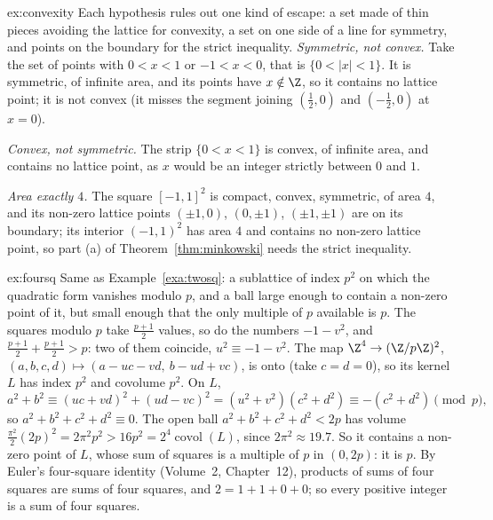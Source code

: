 \begin{solution}{ex:convexity}
\idea Each hypothesis rules out one kind of escape: a set made of thin pieces avoiding the lattice for convexity, a set
on one side of a line for symmetry, and points on the boundary for the strict inequality.
\writeup \emph{Symmetric, not convex.} Take the set of points with $0<x<1$ or $-1<x<0$, that is $\{0<|x|<1\}$. It is symmetric, of infinite area, and its
points have $x\notin\Z$, so it contains no lattice point; it is not convex (it misses the segment joining $(\frac12,0)$
and $(-\frac12,0)$ at $x=0$).

\emph{Convex, not symmetric.} The strip $\{0<x<1\}$ is convex, of infinite area, and contains no lattice point, as $x$
would be an integer strictly between $0$ and $1$.

\emph{Area exactly $4$.} The square $[-1,1]^2$ is compact, convex, symmetric, of area $4$, and its non-zero lattice points
$(\pm1,0)$, $(0,\pm1)$, $(\pm1,\pm1)$ are on its boundary; its interior $(-1,1)^2$ has area $4$ and contains no non-zero
lattice point, so part (a) of Theorem~\ref{thm:minkowski} needs the strict inequality.
\end{solution}

\begin{solution}{ex:foursq}
\idea Same as Example~\ref{exa:twosq}: a sublattice of index $p^2$ on which the quadratic form vanishes modulo $p$, and a
ball large enough to contain a non-zero point of it, but small enough that the only multiple of $p$ available is $p$.
\writeup The squares modulo $p$ take $\frac{p+1}2$ values, so do the numbers $-1-v^2$, and $\frac{p+1}2+\frac{p+1}2>p$: two of
them coincide, $u^2\equiv-1-v^2$. The map $\Z^4\to(\Z/p\Z)^2$, $(a,b,c,d)\mapsto(a-uc-vd,\ b-ud+vc)$, is onto (take
$c=d=0$), so its kernel $L$ has index $p^2$ and covolume $p^2$. On $L$,
\[
a^2+b^2\equiv(uc+vd)^2+(ud-vc)^2=(u^2+v^2)(c^2+d^2)\equiv-(c^2+d^2)\pmod p,
\]
so $a^2+b^2+c^2+d^2\equiv0$. The open ball $a^2+b^2+c^2+d^2<2p$ has volume $\frac{\pi^2}2(2p)^2=2\pi^2p^2>16p^2=2^4
\operatorname{covol}(L)$, since $2\pi^2\approx19.7$. So it contains a non-zero point of $L$, whose sum of squares is a
multiple of $p$ in $(0,2p)$: it is $p$. By Euler's four-square identity (Volume~2, Chapter~12), products of sums of four
squares are sums of four squares, and $2=1+1+0+0$; so every positive integer is a sum of four squares.
\end{solution}

